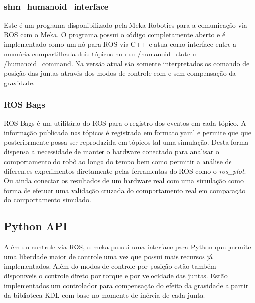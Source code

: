 \subsubsection{shm\_humanoid\_interface}

Este é um programa disponibilizado pela Meka Robotics para a comunicação via ROS com o Meka. O programa possui o código completamente aberto e é implementado como um nó para ROS via C++ e atua como interface entre a memória compartilhada dois tópicos no ros: /humanoid\_state e /humanoid\_command. Na versão atual são somente interpretados os comando de posição das juntas através dos modos de controle com e sem compensação da gravidade.

\subsubsection{ROS Bags}

ROS Bags é um utilitário do ROS para o registro dos eventos em cada tópico. A informação publicada nos tópicos é registrada em formato yaml e permite que que posteriormente possa ser reproduzida em tópicos tal uma simulação. Desta forma dispensa a necessidade de manter o hardware conectado para analisar o comportamento do robô ao longo do tempo bem como permitir a análise de diferentes experimentos diretamente pelas ferramentas do ROS como o \textit{ros\_plot}. Ou ainda conectar os resultados de um hardware real com uma simulação como forma de efetuar uma validação cruzada do comportamento real em comparação do comportamento simulado.

\subsection{Python API}

Além do controle via ROS, o meka possui uma interface para Python que permite uma liberdade maior de controle uma vez que possui mais recursos já implementados. Além do modos de controle por posição estão também disponíveis o controle direto por torque e por velocidade das juntas. Estão implementados um controlador para compensação do efeito da gravidade a partir da biblioteca KDL com base no momento de inércia de cada junta.

